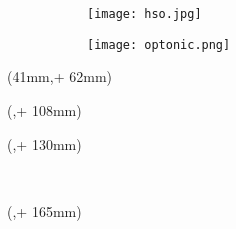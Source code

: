 \newlength{\bindekorrektur}
\newlength{\seitenanfang}
\newlength{\seitenbreite}
  
\setlength{\bindekorrektur}{-46mm}   %
\setlength{\seitenanfang}{0mm}       %
\setlength{\seitenbreite}{297mm}

\captionsetup[figure]{labelformat=empty}
\noindent 
\begin{figure}
	\begin{subfigure}[b]{0.5\textwidth}
		\texttt{[image: hso.jpg]}
	\end{subfigure} 
	\begin{subfigure}[b]{0.5\textwidth}
		\centering
		\texttt{[image: optonic.png]}
	\end{subfigure} 
	\caption[]{}
\end{figure}
\captionsetup[figure]{labelformat=simple}
\begin{textblock*}{128mm}(41mm,\seitenanfang + 62mm) %
  \centering\Large\sffamily
  \vspace{12mm} %
  \textbf{\hsmatitel}
\end{textblock*}%

\begin{textblock*}{\seitenbreite}(\bindekorrektur,\seitenanfang + 108mm)
  \centering\large\sffamily
  \hsmaautor
\end{textblock*}

\begin{textblock*}{\seitenbreite}(\bindekorrektur,\seitenanfang + 130mm)
  \centering\large\sffamily
  \textbf{\hsmatyp}\\
  \begin{small}\hsmathesistype \end{small}\\
  \vspace{6mm}
  \hsmastudiengangname
\end{textblock*}

\begin{textblock*}{\seitenbreite}(\bindekorrektur,\seitenanfang + 165mm)
  \centering\large\sffamily
  \hsmafakultaetlang\\
  \vspace{2mm}
  \hsmakoerperschaft
\end{textblock*}

